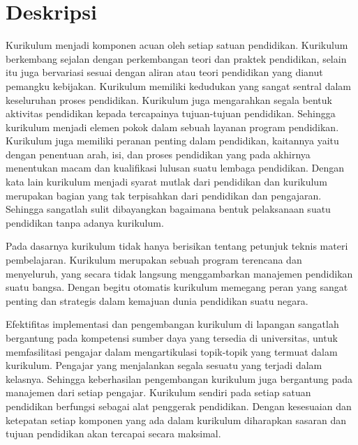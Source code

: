 \documentclass[a4paper,twoside]{article}
\begin{document}
\title{\@judultopik}
\author{\nama \textendash \@npm} 

\newcommand{\nama}{Muhammad Taufik Adianto}
\newcommand{\@npm}{2012730089}
\newcommand{\@judultopik}{Pemodelan Kuliah Kurikulum 2018 Dalam Format JSON} %
\newcommand{\jumpemb}{1} %
\newcommand{\tanggal}{03/02/2018}
\maketitle


\section{Deskripsi}
Kurikulum menjadi komponen acuan oleh setiap satuan pendidikan. Kurikulum berkembang sejalan dengan perkembangan teori dan praktek pendidikan, selain itu juga bervariasi sesuai dengan aliran atau teori pendidikan yang dianut pemangku kebijakan. Kurikulum memiliki kedudukan yang sangat sentral dalam keseluruhan proses pendidikan. Kurikulum juga mengarahkan segala bentuk aktivitas pendidikan kepada tercapainya tujuan-tujuan pendidikan. Sehingga kurikulum menjadi elemen pokok dalam sebuah layanan program pendidikan. Kurikulum juga memiliki peranan penting dalam pendidikan, kaitannya yaitu dengan penentuan arah, isi, dan proses pendidikan yang pada akhirnya menentukan macam dan kualifikasi lulusan suatu lembaga pendidikan. Dengan kata lain kurikulum menjadi syarat mutlak dari pendidikan dan kurikulum merupakan bagian yang tak terpisahkan dari pendidikan dan pengajaran. Sehingga sangatlah sulit dibayangkan bagaimana bentuk pelaksanaan suatu pendidikan tanpa adanya kurikulum.

Pada dasarnya kurikulum tidak hanya berisikan tentang petunjuk teknis materi pembelajaran. Kurikulum merupakan sebuah program terencana dan menyeluruh, yang secara tidak langsung menggambarkan manajemen pendidikan suatu bangsa. Dengan begitu otomatis kurikulum memegang peran yang sangat penting dan strategis dalam kemajuan dunia pendidikan suatu negara.

Efektifitas implementasi dan pengembangan kurikulum di lapangan sangatlah bergantung pada kompetensi sumber daya yang tersedia di universitas, untuk memfasilitasi pengajar dalam mengartikulasi topik-topik yang termuat dalam kurikulum. Pengajar yang menjalankan segala sesuatu yang terjadi dalam kelasnya. Sehingga keberhasilan pengembangan kurikulum juga bergantung pada manajemen dari setiap pengajar. Kurikulum sendiri pada setiap satuan pendidikan berfungsi sebagai alat penggerak pendidikan. Dengan kesesuaian dan ketepatan setiap komponen yang ada dalam kurikulum diharapkan sasaran dan tujuan pendidikan akan tercapai secara maksimal.
\end{document}
